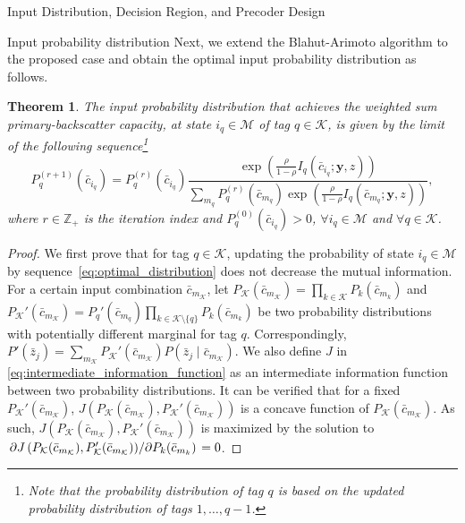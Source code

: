 \documentclass[journal]{IEEEtran}
\newtheorem{theorem}{Theorem}
\begin{document}
\begin{section}{Input Distribution, Decision Region, and Precoder Design}
\begin{subsection}{Input probability distribution}
			Next, we extend the Blahut-Arimoto algorithm to the proposed case and obtain the optimal input probability distribution as follows.

			\begin{theorem}
				The input probability distribution that achieves the weighted sum primary-backscatter capacity, at state $i_q \in \mathcal{M}$ of tag $q \in \mathcal{K}$, is given by the limit of the following sequence\footnote{Note that the probability distribution of tag $q$ is based on the updated probability distribution of tags $1,\ldots,q-1$.}
				\begin{equation}
					P_q^{(r+1)}(\bar{c}_{i_q}) = P_q^{(r)}(\bar{c}_{i_q}) \frac{\exp \left( \frac{\rho}{1 - \rho} I_q(\bar{c}_{i_q};\boldsymbol{y},z) \right)}{\sum_{m_q} P_q^{(r)}(\bar{c}_{m_q}) \exp \left( \frac{\rho}{1 - \rho} I_q(\bar{c}_{m_q};\boldsymbol{y},z) \right)},
					\label{eq:optimal_distribution}
				\end{equation}
				where $r \in \mathbb{Z}_+$ is the iteration index and $P_q^{(0)}(\bar{c}_{i_q}) > 0$, $\forall i_q \in \mathcal{M}$ and $\forall q \in \mathcal{K}$.
				\label{th:optimal_distribution}
			\end{theorem}
			\begin{proof}
				We first prove that for tag $q \in \mathcal{K}$, updating the probability of state $i_q \in \mathcal{M}$ by sequence~\eqref{eq:optimal_distribution} does not decrease the mutual information.
				For a certain input combination $\bar{c}_{m_{\mathcal{K}}}$, let $P_{\mathcal{K}}(\bar{c}_{m_{\mathcal{K}}}) = \prod_{k \in \mathcal{K}} P_k(\bar{c}_{m_k})$ and $P_{\mathcal{K}}'(\bar{c}_{m_{\mathcal{K}}}) = P_q'(\bar{c}_{m_q}) \prod_{k \in \mathcal{K} \setminus \{q\}} P_k(\bar{c}_{m_k})$ be two probability distributions with potentially different marginal for tag $q$. Correspondingly, $P'(\bar{z}_j) = \sum_{m_{\mathcal{K}}} P_{\mathcal{K}}'(\bar{c}_{m_{\mathcal{K}}}) P(\bar{z}_j \mid \bar{c}_{m_{\mathcal{K}}})$. We also define $J$ in \eqref{eq:intermediate_information_function} as an intermediate information function between two probability distributions. It can be verified that for a fixed $P_{\mathcal{K}}'(\bar{c}_{m_{\mathcal{K}}})$, $J \left( P_{\mathcal{K}}(\bar{c}_{m_{\mathcal{K}}}),P_{\mathcal{K}}'(\bar{c}_{m_{\mathcal{K}}}) \right)$ is a concave function of $P_{\mathcal{K}}(\bar{c}_{m_{\mathcal{K}}})$. As such, $J \left( P_{\mathcal{K}}(\bar{c}_{m_{\mathcal{K}}}),P_{\mathcal{K}}'(\bar{c}_{m_{\mathcal{K}}}) \right)$ is maximized by the solution to $\pdv*{J \left( P_{\mathcal{K}}(\bar{c}_{m_{\mathcal{K}}}),P_{\mathcal{K}}'(\bar{c}_{m_{\mathcal{K}}}) \right)}{P_k(\bar{c}_{m_k})} = 0$.

\end{proof}
\end{subsection}
\end{section}
\end{document}
